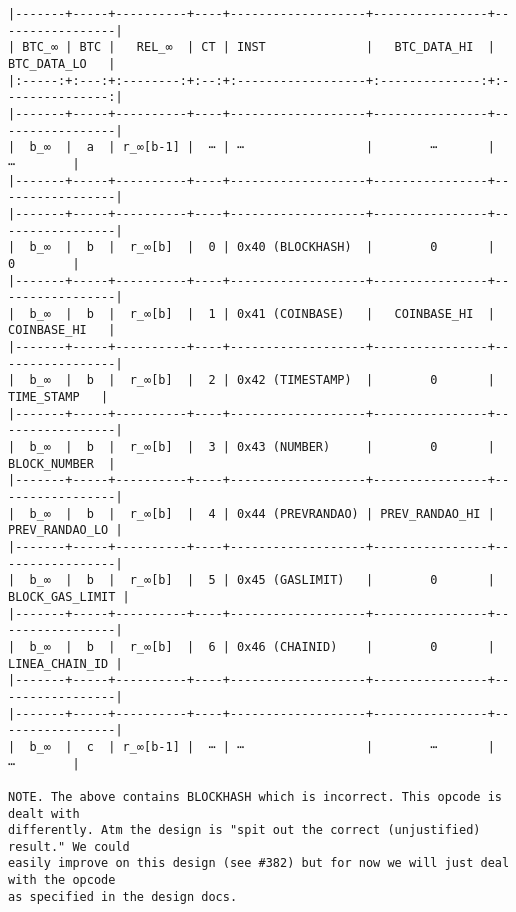 \documentclass[varwidth=\maxdimen,margin=0.5cm,multi={verbatim}]{standalone}
\begin{document}
\begin{verbatim}
|-------+-----+----------+----+-------------------+----------------+-----------------|
| BTC_∞ | BTC |   REL_∞  | CT | INST              |   BTC_DATA_HI  |   BTC_DATA_LO   |
|:-----:+:---:+:--------:+:--:+:------------------+:--------------:+:---------------:|
|-------+-----+----------+----+-------------------+----------------+-----------------|
|  b_∞  |  a  | r_∞[b-1] |  ⋯ | ⋯                 |        ⋯       |        ⋯        |
|-------+-----+----------+----+-------------------+----------------+-----------------|
|-------+-----+----------+----+-------------------+----------------+-----------------|
|  b_∞  |  b  |  r_∞[b]  |  0 | 0x40 (BLOCKHASH)  |        0       |        0        |
|-------+-----+----------+----+-------------------+----------------+-----------------|
|  b_∞  |  b  |  r_∞[b]  |  1 | 0x41 (COINBASE)   |   COINBASE_HI  |   COINBASE_HI   |
|-------+-----+----------+----+-------------------+----------------+-----------------|
|  b_∞  |  b  |  r_∞[b]  |  2 | 0x42 (TIMESTAMP)  |        0       |    TIME_STAMP   |
|-------+-----+----------+----+-------------------+----------------+-----------------|
|  b_∞  |  b  |  r_∞[b]  |  3 | 0x43 (NUMBER)     |        0       |   BLOCK_NUMBER  |
|-------+-----+----------+----+-------------------+----------------+-----------------|
|  b_∞  |  b  |  r_∞[b]  |  4 | 0x44 (PREVRANDAO) | PREV_RANDAO_HI |  PREV_RANDAO_LO |
|-------+-----+----------+----+-------------------+----------------+-----------------|
|  b_∞  |  b  |  r_∞[b]  |  5 | 0x45 (GASLIMIT)   |        0       | BLOCK_GAS_LIMIT |
|-------+-----+----------+----+-------------------+----------------+-----------------|
|  b_∞  |  b  |  r_∞[b]  |  6 | 0x46 (CHAINID)    |        0       |  LINEA_CHAIN_ID |
|-------+-----+----------+----+-------------------+----------------+-----------------|
|-------+-----+----------+----+-------------------+----------------+-----------------|
|  b_∞  |  c  | r_∞[b-1] |  ⋯ | ⋯                 |        ⋯       |        ⋯        |

NOTE. The above contains BLOCKHASH which is incorrect. This opcode is dealt with
differently. Atm the design is "spit out the correct (unjustified) result." We could
easily improve on this design (see #382) but for now we will just deal with the opcode
as specified in the design docs.
\end{verbatim}
\end{document}
